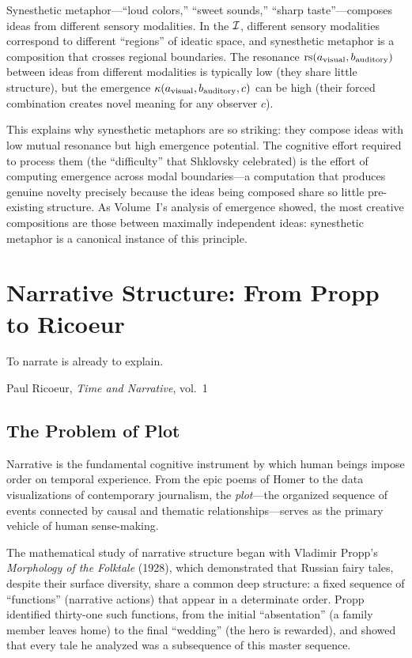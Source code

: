 \begin{remark}
\label{rem:synesthesia}
Synesthetic metaphor---``loud colors,'' ``sweet sounds,'' ``sharp taste''---composes ideas from different sensory modalities.  In the $\mathcal{I}$, different sensory modalities correspond to different ``regions'' of ideatic space, and synesthetic metaphor is a composition that crosses regional boundaries.  The resonance $\mathrm{rs}(a_{\text{visual}}, b_{\text{auditory}})$ between ideas from different modalities is typically low (they share little structure), but the emergence $\kappa(a_{\text{visual}}, b_{\text{auditory}}, c)$ can be high (their forced combination creates novel meaning for any observer $c$).

This explains why synesthetic metaphors are so striking: they compose ideas with low mutual resonance but high emergence potential.  The cognitive effort required to process them (the ``difficulty'' that Shklovsky celebrated) is the effort of computing emergence across modal boundaries---a computation that produces genuine novelty precisely because the ideas being composed share so little pre-existing structure.  As Volume~I's analysis of emergence showed, the most creative compositions are those between maximally independent ideas: synesthetic metaphor is a canonical instance of this principle.
\end{remark}


\chapter{Narrative Structure: From Propp to Ricoeur}
\label{ch:narrative}

\epigraph{To narrate is already to explain.}{Paul Ricoeur,
\textit{Time and Narrative}, vol.~1}

\section{The Problem of Plot}

Narrative is the fundamental cognitive instrument by which human beings impose
order on temporal experience.  From the epic poems of Homer to the data
visualizations of contemporary journalism, the \emph{plot}---the organized
sequence of events connected by causal and thematic relationships---serves as
the primary vehicle of human sense-making.

The mathematical study of narrative structure began with Vladimir Propp's
\textit{Morphology of the Folktale} (1928), which demonstrated that Russian
fairy tales, despite their surface diversity, share a common deep structure:
a fixed sequence of ``functions'' (narrative actions) that appear in a
determinate order.  Propp identified thirty-one such functions, from the
initial ``absentation'' (a family member leaves home) to the final ``wedding''
(the hero is rewarded), and showed that every tale he analyzed was a subsequence
of this master sequence.

